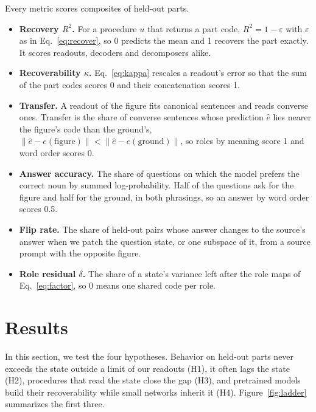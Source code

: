 Every metric scores composites of held-out parts.
\begin{itemize}
  \item \textbf{Recovery $R^2$.} For a procedure $u$ that returns a part code, $R^2 = 1 - \varepsilon$ with $\varepsilon$ as in Eq.~\eqref{eq:recover}, so 0 predicts the mean and 1 recovers the part exactly. It scores readouts, decoders and decomposers alike.
  \item \textbf{Recoverability $\kappa$.} Eq.~\eqref{eq:kappa} rescales a readout's error so that the sum of the part codes scores 0 and their concatenation scores 1.
  \item \textbf{Transfer.} A readout of the figure fits canonical sentences and reads converse ones. Transfer is the share of converse sentences whose prediction $\hat{e}$ lies nearer the figure's code than the ground's, $\lVert \hat{e} - e(\text{figure}) \rVert < \lVert \hat{e} - e(\text{ground}) \rVert$, so roles by meaning score 1 and word order scores 0.
  \item \textbf{Answer accuracy.} The share of questions on which the model prefers the correct noun by summed log-probability. Half of the questions ask for the figure and half for the ground, in both phrasings, so an answer by word order scores 0.5.
  \item \textbf{Flip rate.} The share of held-out pairs whose answer changes to the source's answer when we patch the question state, or one subspace of it, from a source prompt with the opposite figure.
  \item \textbf{Role residual $\delta$.} The share of a state's variance left after the role maps of Eq.~\eqref{eq:factor}, so 0 means one shared code per role.
\end{itemize}

\section{Results}
\label{sec:results}

In this section, we test the four hypotheses. Behavior on held-out parts never exceeds the state outside a limit of our readouts (H1), it often lags the state (H2), procedures that read the state close the gap (H3), and pretrained models build their recoverability while small networks inherit it (H4). Figure~\ref{fig:ladder} summarizes the first three.


